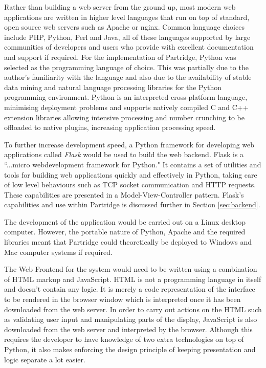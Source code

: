 Rather than building a web server from the ground up, most modern web
applications are written in higher level languages that run on top of standard,
open source web servers such as Apache or nginx. Common language choices
include PHP, Python, Perl and Java, all of these languages supported by large
communities of developers and users who provide with excellent documentation
and support if required.  For the implementation of Partridge, Python was
selected as the programming language of choice. This was partially due to the
author's familiarity with the language and also due to the availability of
stable data mining\cite{curk05} and natural language
processing\cite{bird2009natural} libraries for the Python programming
environment. Python is an interpreted cross-platform language, minimising
deployment problems and supports natively compiled C and C++ extension
libraries allowing intensive processing  and number crunching to be offloaded
to native plugins, increasing application processing speed.

To further increase development speed, a Python framework for developing web
applications called \emph{Flask} would be used to build the web backend. Flask
is a ``...micro webdevelopment framework for Python.\cite{flask2012}" It
contains a set of utilities and tools for building web applications quickly and
effectively in Python, taking care of low level behaviours such as TCP socket
communication and HTTP requests. These capabilities are presented in a
Model-View-Controller pattern. Flask's capabilities and use within Partridge is
discussed further in Section \ref{sec:backend}.

The development of the application would be carried out on a Linux desktop
computer. However, the portable nature of Python, Apache and the required
libraries meant that Partridge could theoretically be deployed to Windows and
Mac computer systems if required.

The Web Frontend for the system would need to be written using a combination of
HTML markup and JavaScript. HTML is not a programming language in itself and
doesn't contain any logic. It is merely a code representation of the interface
to be rendered in the browser window which is interpreted once it has been
downloaded from the web server. In order to carry out actions on the HTML such
as validating user input and manipulating parts of the display, JavaScript is
also downloaded from the web server and interpreted by the browser. Although
this requires the developer to have knowledge of two extra technologies on top
of Python, it also makes enforcing the design principle of keeping presentation
and logic separate a lot easier.

